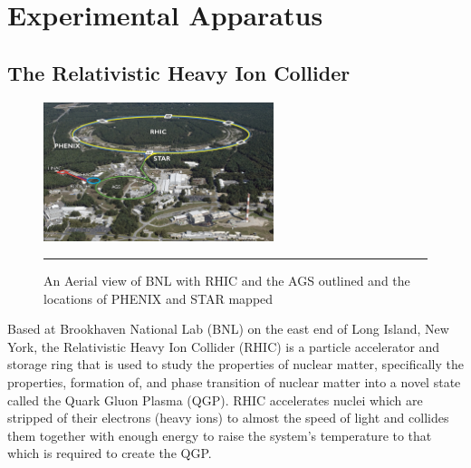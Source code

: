 
\chapter{Experimental Apparatus} %


\section{The Relativistic Heavy Ion Collider}
\begin{figure}[htbp]
  \centering
    \includegraphics[width=0.6\textwidth]{Figures/RHIC-aerial-HR.jpg}
    \rule{35em}{0.5pt}
  \caption[An Aerial view of BNL]{An Aerial view of BNL with RHIC and the AGS outlined and the locations of PHENIX and STAR mapped}
  \label{fig:Aerial RHIC}
\end{figure}
\indent Based at Brookhaven National Lab (BNL) on the east end of Long Island, New York, the Relativistic Heavy Ion Collider (RHIC) is a particle accelerator and storage ring that is used to study the properties of nuclear matter, specifically the properties, formation of, and phase transition of nuclear matter into a novel state called the Quark Gluon Plasma (QGP).  RHIC accelerates nuclei which are stripped of their electrons (heavy ions) to almost the speed of light and collides them together with enough energy to raise the system's temperature to that which is required to create the QGP. 

